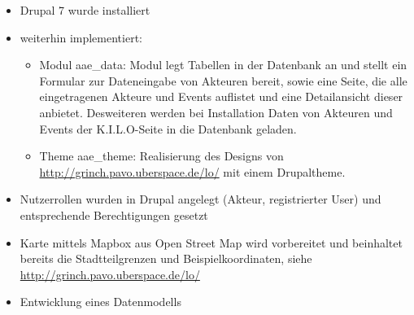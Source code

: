 \documentclass{swp}
\begin{document}
\\\\\\\\\\

\begin{itemize} 
\item Drupal 7 wurde installiert
\item weiterhin implementiert:
\begin{itemize} 
\item Modul \glqq aae\_{}data\grqq{}: Modul legt Tabellen in der Datenbank an und stellt ein Formular zur Dateneingabe von Akteuren bereit, sowie eine Seite, die alle eingetragenen Akteure und Events auflistet und eine Detailansicht dieser anbietet. Desweiteren werden bei Installation Daten von Akteuren und Events der K.I.L.O-Seite in die Datenbank geladen. 
\item Theme \glqq aae\_{}theme\grqq{}: Realisierung des Designs von \url{http://grinch.pavo.uberspace.de/lo/} mit einem Drupaltheme.
\end{itemize}
\item Nutzerrollen wurden in Drupal angelegt (Akteur, registrierter User) und entsprechende Berechtigungen gesetzt
\item Karte mittels Mapbox aus Open Street Map wird vorbereitet und beinhaltet bereits die Stadtteilgrenzen und Beispielkoordinaten, siehe \url{http://grinch.pavo.uberspace.de/lo/}
\item Entwicklung eines Datenmodells\\\\
\end{itemize}
\end{document}
